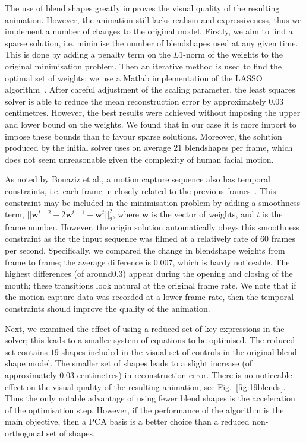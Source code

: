 \documentclass[11pt]{report}
\newcommand{\w}{\mathbf{w}}
\begin{document}
The use of blend shapes greatly improves the visual quality of the resulting animation. However, the animation still lacks realism and expressiveness, thus we implement a number of changes to the original model. Firstly, we aim to find a sparse solution, i.e. minimise the number of blendshapes used at any given time. This is done by adding a penalty term on the $L1$-norm of the weights to the original minimisation problem. Then an iterative method is used to find the optimal set of weights; we use a Matlab implementation of the LASSO algorithm~\cite{Schmidt:2005}. After careful adjustment of the scaling parameter, the least squares solver is able to reduce the mean reconstruction error by approximately $0.03$ centimetres. However, the best results were achieved without imposing the upper and lower bound on the weights. We found that in our case it is more import to impose these bounds than to favour sparse solutions. Moreover, the solution produced by the initial solver uses on average $21$ blendshapes per frame, which does not seem unreasonable given the complexity of human facial motion.

As noted by Bouaziz et al., a motion capture sequence also has temporal constraints, i.e. each frame in closely related to the previous frames~\cite{Bouaziz:2013}. This constraint may be included in the minimisation problem by adding a smoothness term, $||\w^{t-2} - 2 \w^{t-1} + \w^t||^2_2$, where $\w$ is the vector of weights, and $t$ is the frame number. However, the origin solution automatically obeys this smoothness constraint as the the input sequence was filmed at a relatively rate of $60$ frames per second. Specifically, we compared the change in blendshape weights from frame to frame; the average difference is $0.007$, which is hardy noticeable. The highest differences (of around$0.3$) appear during the opening and closing of the mouth; these transitions look natural at the original frame rate. We note that if the motion capture data was recorded at a lower frame rate, then the temporal constraints should improve the quality of the animation.

Next, we examined the effect of using a reduced set of key expressions in the solver; this leads to a smaller system of equations to be optimised. The reduced set contains $19$ shapes included in the visual set of controls in the original blend shape model. The smaller set of shapes leads to a slight increase (of approximately $0.03$ centimetres) in reconstruction error. There is no noticeable effect on the visual quality of the resulting animation, see Fig.~\ref{fig:19blends}. Thus the only notable advantage of using fewer blend shapes is the acceleration of the  optimisation step. However, if the performance of the algorithm is the main objective, then a PCA basis is a better choice than a reduced non-orthogonal set of shapes.
\end{document}
